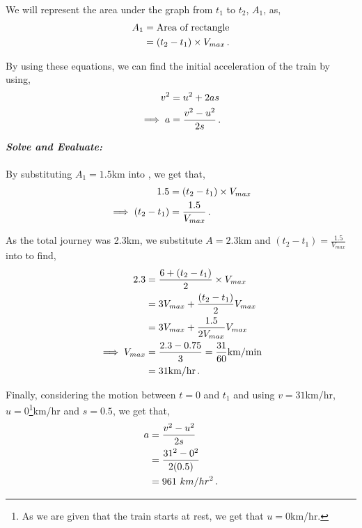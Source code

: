 \begin{subquestions}
\begin{subsubquestions}
We will represent the area under the graph from $t_1$ to $t_2$, $A_1$, as,
\begin{align}
	A_1 & = \text{Area of rectangle} \nonumber \\
	& = (t_2-t_1)\times V_{max} \,. \label{2011:q6:AEqn2}
\end{align}  
	
By using these equations, we can find the initial acceleration of the train by using,
\begin{align}
	v^2 & = u^2 + 2as \nonumber \\
	\implies a & = \frac{v^2-u^2}{2s} \,.
\end{align}




\textbf{\textit{Solve and Evaluate:}} \\ \\
By substituting $A_1=1.5$km into , we get that,
\begin{align}
	1.5 & = (t_2-t_1)\times V_{max} \nonumber \\
	\implies (t_2-t_1) & = \frac{1.5}{V_{max}} \,.
\end{align}

As the total journey was 2.3km, we substitute $A=2.3$km and $(t_2-t_1) = \frac{1.5}{V_{max}}$ into  to find,
\begin{align}
	2.3 & = \frac{6 + (t_2-t_1)}{2}\times V_{max} \nonumber \\
		& = 3V_{max} + \frac{(t_2-t_1)}{2}V_{max} \nonumber \\
		& = 3V_{max} + \frac{1.5}{2V_{max}}V_{max} \nonumber \\
		\implies V_{max} & = \frac{2.3-0.75}{3} = \frac{31}{60} \text{km/min} \nonumber \\
		               & = 31\text{km/hr} \,.
\end{align}

Finally, considering the motion between $t=0$ and $t_1$ and using $v=31$km/hr, $u=0$\footnote{As we are given that the train starts at rest, we get that $u=0$km/hr.}km/hr and $s=0.5$, we get that,
\begin{align}
	a & = \frac{v^2-u^2}{2s} \nonumber \\
	  & = \frac{31^2-0^2}{2(0.5)} \nonumber \\
	  & = 961 ~km/hr^2 \,.
\end{align}

\end{subsubquestions}	
	
	

\end{subquestions}
